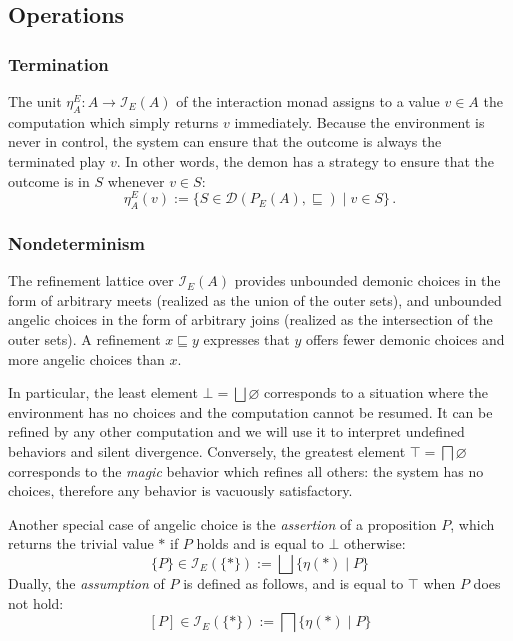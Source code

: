 \documentclass[format=sigplan,authordraft]{acmart}
\begin{document}
\subsection{Operations}

\subsubsection{Termination}

The unit $\eta^E_A : A \rightarrow \mathcal{I}_E(A)$
of the interaction monad
assigns to a value $v \in A$ the computation
which simply returns $v$ immediately.
Because the environment is never in control,
the system can ensure that the outcome is always
the terminated play $v$.
In other words,
the demon has a strategy to ensure that the outcome is in $S$
whenever $v \in S$:
\[
  \eta^E_A(v) :=
    \{ S \in \mathcal{D}(P_E(A), {\sqsubseteq}) \mid v \in S \} \,.
\]

\subsubsection{Nondeterminism}

The refinement lattice over $\mathcal{I}_E(A)$
provides unbounded demonic choices
in the form of arbitrary meets
(realized as the union of the outer sets),
and unbounded angelic choices
in the form of arbitrary joins
(realized as the intersection of the outer sets).
A refinement $x \sqsubseteq y$ expresses that
$y$ offers fewer demonic choices and more angelic choices than $x$.

In particular,
the least element $\bot = \bigsqcup \varnothing$
corresponds to a situation where the environment has no choices
and the computation cannot be resumed.
It can be refined by any other computation and
we will use it to interpret undefined behaviors and silent divergence.
Conversely,
the greatest element $\top = \bigsqcap \varnothing$
corresponds to the \emph{magic} behavior
which refines all others:
the system has no choices,
therefore any behavior is vacuously satisfactory.

Another special case of angelic choice is
the \emph{assertion} of a proposition $P$,
which returns the trivial value $*$ if $P$ holds
and is equal to $\bot$ otherwise:
\[ \{P\} \in \mathcal{I}_E(\{*\}) :=
    \bigsqcup \{ \eta(*) \mid P \} \]
Dually,
the \emph{assumption} of $P$
is defined as follows,
and is equal to $\top$ when $P$ does not hold:
\[ [P] \in \mathcal{I}_E(\{*\}) :=
    \bigsqcap \{ \eta(*) \mid P \} \]
\end{document}
